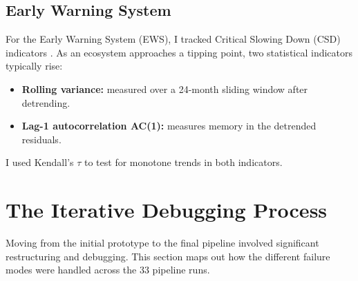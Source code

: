 \documentclass[12pt, a4paper]{article}
\begin{document}


\subsection{Early Warning System}

For the Early Warning System (EWS), I tracked Critical Slowing Down (CSD) indicators \cite{dakos2012,scheffer2009}. As an ecosystem approaches a tipping point, two statistical indicators typically rise:
\begin{itemize}[leftmargin=1.4em]
    \item \textbf{Rolling variance:} measured over a 24-month sliding window after detrending.
    \item \textbf{Lag-1 autocorrelation AC(1):} measures memory in the detrended residuals.
\end{itemize}
I used Kendall's $\tau$ to test for monotone trends in both indicators.

\section{The Iterative Debugging Process}
\label{sec:debugging}

Moving from the initial prototype to the final pipeline involved significant restructuring and debugging. This section maps out how the different failure modes were handled across the 33 pipeline runs.
\end{document}
